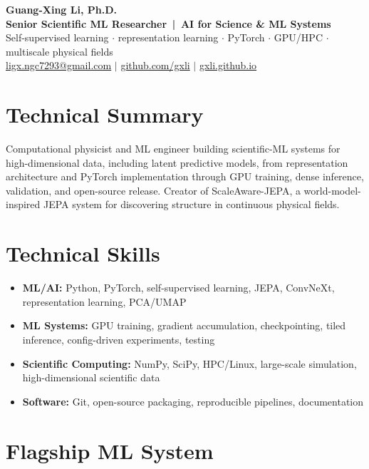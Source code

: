 \documentclass[10pt]{article}
\newcommand{\TargetTitle}{Senior Scientific ML Researcher \,|\, AI for Science \& ML Systems}
\newcommand{\TargetFocus}{Self-supervised learning $\cdot$ representation learning $\cdot$ PyTorch $\cdot$ GPU/HPC $\cdot$ multiscale physical fields}
\begin{document}
\begin{center}
  {\Huge\bfseries Guang-Xing Li, Ph.D.}\\[1.5pt]
  {\large\color{accent}\bfseries \TargetTitle}\\[1.5pt]
  {\small\color{contactgray} \TargetFocus}\\[2pt]
  {\small\color{contactgray}
   \href{mailto:ligx.ngc7293@gmail.com}{ligx.ngc7293@gmail.com} \quad$|$\quad
   \href{https://github.com/gxli}{github.com/gxli} \quad$|$\quad
   \href{https://gxli.github.io}{gxli.github.io}}
\end{center}
\vspace{1.5pt}

\section*{Technical Summary}
Computational physicist and ML engineer building scientific-ML systems for high-dimensional data,
including latent predictive models, from representation architecture and PyTorch implementation
through GPU training, dense inference, validation, and open-source release. Creator of ScaleAware-JEPA, a world-model-inspired JEPA system for
discovering structure in continuous physical fields.

\section*{Technical Skills}
\begin{itemize}
  \item \textbf{ML/AI:} Python, PyTorch, self-supervised learning, JEPA, ConvNeXt, representation
        learning, PCA/UMAP
  \item \textbf{ML Systems:} GPU training, gradient accumulation, checkpointing, tiled inference,
        config-driven experiments, testing
  \item \textbf{Scientific Computing:} NumPy, SciPy, HPC/Linux, large-scale simulation,
        high-dimensional scientific data
  \item \textbf{Software:} Git, open-source packaging, reproducible pipelines, documentation
\end{itemize}

\section*{Flagship ML System}
\end{document}
